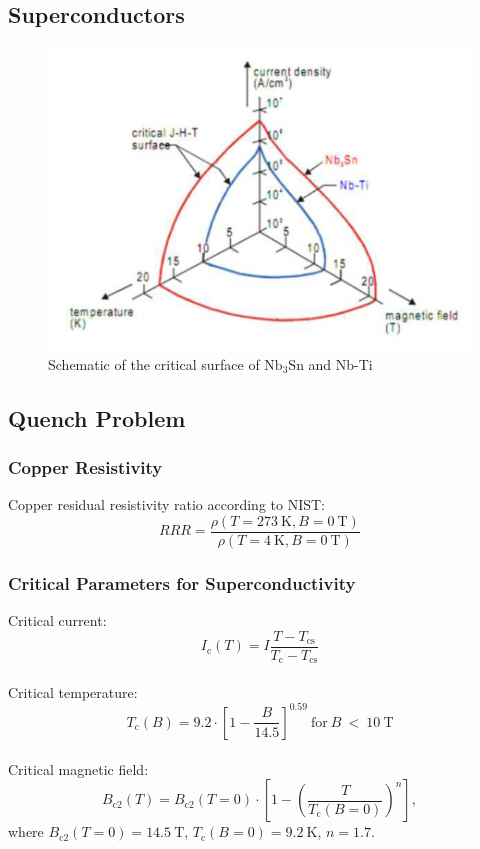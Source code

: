 \documentclass{article}
\begin{document}
\subsection{Superconductors}

\begin{figure}[ht!]
\centering
\includegraphics[width=0.49\linewidth]{figures/introduction/critical_surface_scheme.png}
\caption{Schematic of the critical surface of $\text{Nb}_\text{3}\text{Sn}$ and Nb-Ti \cite{evans_marvel_of_technology}}
\label{fig:scheme_critical_surface}
\end{figure}



\subsection{Quench Problem}

    \subsubsection{Copper Resistivity}
    Copper residual resistivity ratio according to NIST: 
    \begin{equation}
    RRR = \frac{\rho(T=273~\text{K}, B=0~\text{T})}{\rho(T=4~\text{K}, B=0~\text{T})}
    \end{equation}
    
    \subsubsection{Critical Parameters for Superconductivity}
    Critical current:
    \begin{equation}
        I_\text{c}(T) = I \frac{T-T_\text{cs}}{T_\text{c}-T_\text{cs}}
    \end{equation}
    \\
    Critical temperature:
    \begin{equation}
        T_\text{c}(B) = 9.2 \cdot [1- \frac{B}{14.5}]^{0.59}~\text{for}~B~<~10~\text{T}
    \end{equation}
    \\
    Critical magnetic field: 
    \begin{equation}
        B_\text{c2}(T) = B_\text{c2}(T=0) \cdot [1-(\frac{T}{T_\text{c}(B=0)})^{n}],
    \end{equation}
    where
    $B_\text{c2}(T=0)=14.5~\text{T}$, $T_\text{c}(B=0)=9.2~\text{K}$, $n=1.7$.
\end{document}
